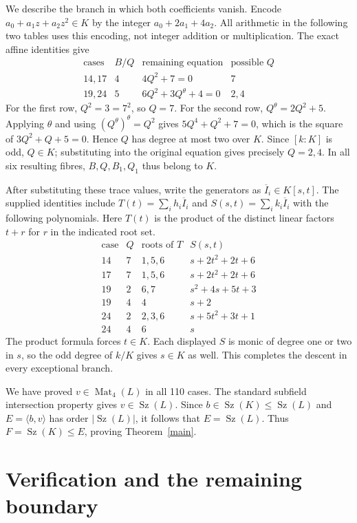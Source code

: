\documentclass[11pt,a4paper]{article}
\newcommand{\Sz}{\operatorname{Sz}}
\begin{document}
We describe the branch in which both coefficients vanish. Encode
$a_0+a_1z+a_2z^2\in K$ by the integer $a_0+2a_1+4a_2$.
All arithmetic in the following two tables uses this encoding, not
integer addition or multiplication. The exact affine identities give
\[
\begin{array}{c|c|c|c}
 \text{cases}&B/Q&\text{remaining equation}&\text{possible }Q\\\hline
 14,17&4&4Q^2+7=0&7\\
 19,24&5&6Q^2+3Q^\theta+4=0&2,4
\end{array}                                                     \tag{5}
\]
For the first row, $Q^2=3=7^2$, so $Q=7$. For the second row,
$Q^\theta=2Q^2+5$. Applying $\theta$ and using
$(Q^\theta)^\theta=Q^2$ gives
$5Q^4+Q^2+7=0$, which is the square of
$3Q^2+Q+5=0$. Hence $Q$ has degree at most two over $K$.
Since $[k:K]$ is odd, $Q\in K$; substituting into the original
equation gives precisely $Q=2,4$. In all six resulting fibres,
$B,Q,B_1,Q_1$ thus belong to $K$.

After substituting these trace values, write the generators as
$\overline I_i\in K[s,t]$. The supplied identities include
$T(t)=\sum_i h_i\overline I_i$ and
$S(s,t)=\sum_i k_i\overline I_i$ with the following polynomials.
Here $T(t)$ is the product of the distinct linear factors
$t+r$ for $r$ in the indicated root set.
\[
\begin{array}{c|c|c|l}
 \text{case}&Q&\text{roots of }T&S(s,t)\\\hline
 14&7&1,5,6&s+2t^2+2t+6\\
 17&7&1,5,6&s+2t^2+2t+6\\
 19&2&6,7&s^2+4s+5t+3\\
 19&4&4&s+2\\
 24&2&2,3,6&s+5t^2+3t+1\\
 24&4&6&s
\end{array}                                                     \tag{6}
\]
The product formula forces $t\in K$. Each displayed $S$ is monic
of degree one or two in $s$, so the odd degree of $k/K$ gives
$s\in K$ as well. This completes the descent in every exceptional
branch.

We have proved $v\in\operatorname{Mat}_4(L)$ in all 110 cases.
The standard subfield intersection property gives
$v\in\Sz(L)$. Since $b\in\Sz(K)\le\Sz(L)$ and
$E=\langle b,v\rangle$ has order $|\Sz(L)|$, it follows that
$E=\Sz(L)$. Thus $F=\Sz(K)\le E$, proving Theorem~\ref{main}.

\section*{Verification and the remaining boundary}
\end{document}
